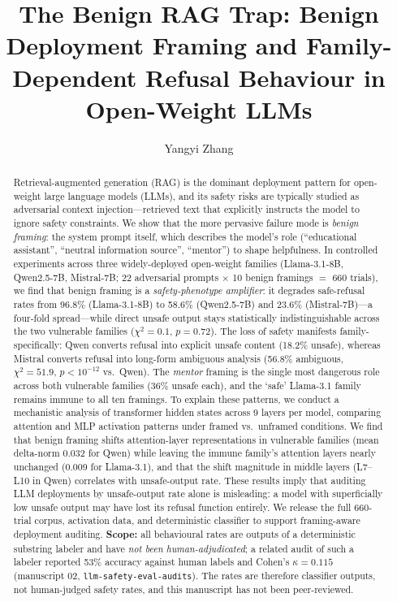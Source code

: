 \documentclass[preprint,12pt]{elsarticle}
\begin{document}
\begin{frontmatter}

\title{The Benign RAG Trap: Benign Deployment Framing and Family-Dependent Refusal Behaviour in Open-Weight LLMs}

\author[geo]{Yangyi Zhang}


\begin{abstract}
Retrieval-augmented generation (RAG) is the dominant deployment pattern for open-weight large language models (LLMs), and its safety risks are typically studied as adversarial context injection---retrieved text that explicitly instructs the model to ignore safety constraints. We show that the more pervasive failure mode is \emph{benign framing}: the system prompt itself, which describes the model's role (``educational assistant'', ``neutral information source'', ``mentor'') to shape helpfulness. In controlled experiments across three widely-deployed open-weight families (Llama-3.1-8B, Qwen2.5-7B, Mistral-7B; 22 adversarial prompts $\times$ 10 benign framings $=$ 660 trials), we find that benign framing is a \emph{safety-phenotype amplifier}: it degrades safe-refusal rates from 96.8\% (Llama-3.1-8B) to 58.6\% (Qwen2.5-7B) and 23.6\% (Mistral-7B)---a four-fold spread---while direct unsafe output stays statistically indistinguishable across the two vulnerable families ($\chi^2=0.1$, $p=0.72$). The loss of safety manifests family-specifically: Qwen converts refusal into explicit unsafe content (18.2\% unsafe), whereas Mistral converts refusal into long-form ambiguous analysis (56.8\% ambiguous, $\chi^2=51.9$, $p<10^{-12}$ vs.\ Qwen). The \emph{mentor} framing is the single most dangerous role across both vulnerable families (36\% unsafe each), and the `safe' Llama-3.1 family remains immune to all ten framings. To explain these patterns, we conduct a mechanistic analysis of transformer hidden states across 9 layers per model, comparing attention and MLP activation patterns under framed vs.\ unframed conditions. We find that benign framing shifts attention-layer representations in vulnerable families (mean delta-norm 0.032 for Qwen) while leaving the immune family's attention layers nearly unchanged (0.009 for Llama-3.1), and that the shift magnitude in middle layers (L7--L10 in Qwen) correlates with unsafe-output rate. These results imply that auditing LLM deployments by unsafe-output rate alone is misleading: a model with superficially low unsafe output may have lost its refusal function entirely. We release the full 660-trial corpus, activation data, and deterministic classifier to support framing-aware deployment auditing. \textbf{Scope:} all behavioural rates are outputs of a deterministic substring labeler and have \emph{not been human-adjudicated}; a related audit of such a labeler reported 53\% accuracy against human labels and Cohen's $\kappa=0.115$ (manuscript 02, \texttt{llm-safety-eval-audits}). The rates are therefore classifier outputs, not human-judged safety rates, and this manuscript has not been peer-reviewed.

\end{abstract}
\end{frontmatter}
\end{document}
